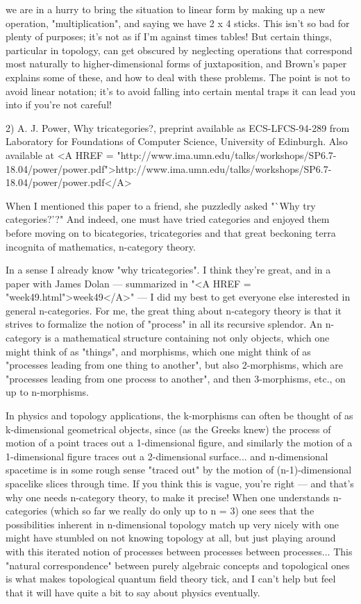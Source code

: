   
we are in a hurry to bring the situation to linear form by making
up a new operation, "multiplication", and saying we have 2 x 4
sticks.  This isn't so bad for plenty of purposes; it's not as
if I'm against times tables!   But certain things, particular in topology, 
can get obscured by neglecting operations that correspond most
naturally to higher-dimensional forms of juxtaposition, and Brown's 
paper explains some of these, and how to deal with these problems.  
The point is not to avoid linear notation; it's to avoid falling 
into certain mental traps it can lead you into if you're not careful!
  
2) A. J. Power, Why tricategories?, preprint available
as ECS-LFCS-94-289 from Laboratory for Foundations of Computer
Science, University of Edinburgh.  Also available at
<A HREF = "http://www.ima.umn.edu/talks/workshops/SP6.7-18.04/power/power.pdf">http://www.ima.umn.edu/talks/workshops/SP6.7-18.04/power/power.pdf</A>


When I mentioned this paper to a friend, she puzzledly asked
"`Why try categories?'?"  And indeed, one must have tried
categories and enjoyed them before moving on to bicategories,
tricategories and that great beckoning terra incognita of
mathematics, n-category theory.

In a sense I already know "why tricategories".  I think they're 
great, and in a paper with James Dolan --- summarized in "<A HREF = "week49.html">week49</A>" --- 
I did my best to get everyone else interested in general 
n-categories.  For me, the great thing about n-category theory 
is that it strives to formalize the notion of "process" in 
all its recursive splendor.   An n-category is a mathematical
structure containing not only objects, which one might think of as 
"things", and morphisms, which one might think of as "processes leading
from one thing to another", but also 2-morphisms, which are
"processes leading from one process to another", and then
3-morphisms, etc., on up to n-morphisms.   

In physics and topology applications, the k-morphisms can often be 
thought of as k-dimensional geometrical objects, since (as the Greeks knew)
the process of motion of a point traces out a 1-dimensional figure, 
and similarly the motion of a 1-dimensional figure traces out
a 2-dimensional surface... and n-dimensional spacetime is in some
rough sense "traced out" by the motion of (n-1)-dimensional spacelike slices 
through time.  If you think this is vague, you're right --- and
that's why one needs n-category theory, to make it precise!   When 
one understands n-categories (which so far we really do only
up to n = 3) one sees that the possibilities inherent in n-dimensional
topology match up very nicely with one might have stumbled on
not knowing topology at all, but just playing around with this
iterated notion of processes between processes between processes...
This "natural correspondence" between purely algebraic
concepts and topological ones is what makes topological quantum field 
theory tick, and I can't help but feel that it will have quite
a bit to say about physics eventually.


